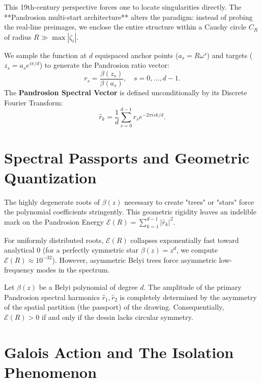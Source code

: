 This 19th-century perspective forces one to locate singularities directly. The **Pandrosion multi-start architecture** alters the paradigm: instead of probing the real-line preimages, we enclose the entire structure within a Cauchy circle $C_R$ of radius $R \gg \max|\zeta_i|$. 

We sample the function at $d$ equispaced anchor points ($a_s = R\omega^s$) and targets ($z_s = a_s e^{i\pi/d}$) to generate the Pandrosion ratio vector:
\begin{equation}
r_s = \frac{\beta(z_s)}{\beta(a_s)}, \quad s = 0, \dots, d-1.
\end{equation}
The \textbf{Pandrosion Spectral Vector} is defined unconditionally by its Discrete Fourier Transform:
\begin{equation}
\hat{r}_k = \frac{1}{d} \sum_{s=0}^{d-1} r_s e^{-2\pi i s k / d}.
\end{equation}

\section{Spectral Passports and Geometric Quantization}

The highly degenerate roots of $\beta(z)$ necessary to create "trees" or "stars" force the polynomial coefficients stringently. This geometric rigidity leaves an indelible mark on the Pandrosion Energy $\mathcal{E}(R) = \sum_{k=1}^{d-1} |\hat{r}_k|^2$.

For uniformly distributed roots, $\mathcal{E}(R)$ collapses exponentially fast toward analytical $0$ (for a perfectly symmetric star $\beta(z) = z^d$, we compute $\mathcal{E}(R) \approx 10^{-32}$). However, asymmetric Belyi trees force asymmetric low-frequency modes in the spectrum.

\begin{theorem}
Let $\beta(z)$ be a Belyi polynomial of degree $d$. The amplitude of the primary Pandrosion spectral harmonics $\hat{r}_1, \hat{r}_2$ is completely determined by the asymmetry of the spatial partition (the passport) of the drawing. Consequentially, $\mathcal{E}(R) > 0$ if and only if the dessin lacks circular symmetry.
\end{theorem}

\section{Galois Action and The Isolation Phenomenon}

